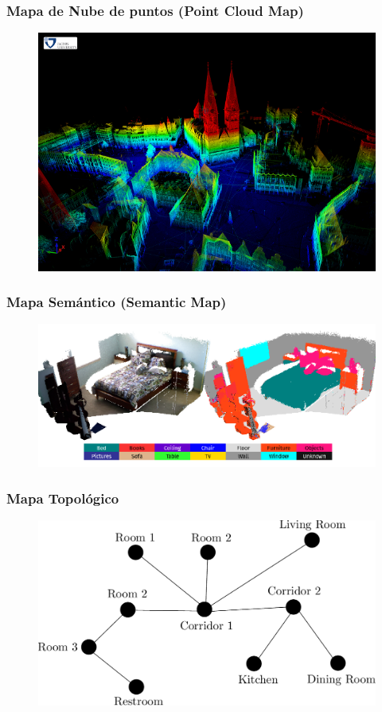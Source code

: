 \begin{frame}
    \frametitle{Mapa de Nube de puntos (Point Cloud Map)}
    
    
   	\begin{figure}
    	\includegraphics[width=0.6\columnwidth]{./images/point_cloud_map_bremen_city.png}
    \end{figure}
    
\end{frame}


\begin{frame}
	\frametitle{Mapa Semántico (Semantic Map)}
	
   	\begin{figure}
    	\includegraphics[width=0.8\columnwidth]{./images/semantic_map_semanticfusion.png}
	\end{figure}
	
\end{frame}


\begin{frame}
	\frametitle{Mapa Topológico}
	
	\begin{figure}
		\includegraphics[width=0.8\columnwidth]{./images/topological_map.pdf}
	\end{figure}
	
\end{frame}

